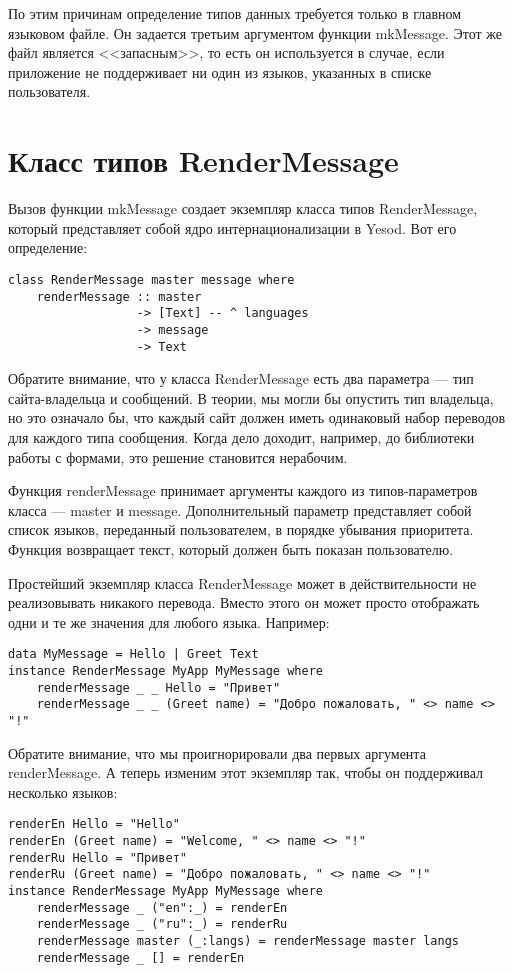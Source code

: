 По этим причинам определение типов данных требуется только в главном языковом файле. Он задается третьим аргументом функции mkMessage. Этот же файл является <<запасным>>, то есть он используется в случае, если приложение не поддерживает ни один из языков, указанных в списке пользователя.

\section{Класс типов RenderMessage} %

Вызов функции mkMessage создает экземпляр класса типов RenderMessage, который представляет собой ядро интернационализации в Yesod. Вот его определение:
\begin{lstlisting}
class RenderMessage master message where
    renderMessage :: master
                  -> [Text] -- ^ languages
                  -> message
                  -> Text 
\end{lstlisting}

Обратите внимание, что у класса RenderMessage есть два параметра --- тип сайта-владельца и сообщений. В теории, мы могли бы опустить тип владельца, но это означало бы, что каждый сайт должен иметь одинаковый набор переводов для каждого типа сообщения. Когда дело доходит, например, до библиотеки работы с формами, это решение становится нерабочим.

Функция renderMessage принимает аргументы каждого из типов-параметров класса --- master и message. Дополнительный параметр представляет собой список языков, переданный пользователем, в порядке убывания приоритета. Функция возвращает текст, который должен быть показан пользователю.

Простейший экземпляр класса RenderMessage может в действительности не реализовывать никакого перевода. Вместо этого он может просто отображать одни и те же значения для любого языка. Например:

\begin{lstlisting}
data MyMessage = Hello | Greet Text
instance RenderMessage MyApp MyMessage where
    renderMessage _ _ Hello = "Привет"
    renderMessage _ _ (Greet name) = "Добро пожаловать, " <> name <> "!"
\end{lstlisting}
    
Обратите внимание, что мы проигнорировали два первых аргумента renderMessage. А теперь изменим этот экземпляр так, чтобы он поддерживал несколько языков:

\begin{lstlisting}
renderEn Hello = "Hello"
renderEn (Greet name) = "Welcome, " <> name <> "!"
renderRu Hello = "Привет"
renderRu (Greet name) = "Добро пожаловать, " <> name <> "!"
instance RenderMessage MyApp MyMessage where
    renderMessage _ ("en":_) = renderEn
    renderMessage _ ("ru":_) = renderRu
    renderMessage master (_:langs) = renderMessage master langs
    renderMessage _ [] = renderEn
\end{lstlisting}

